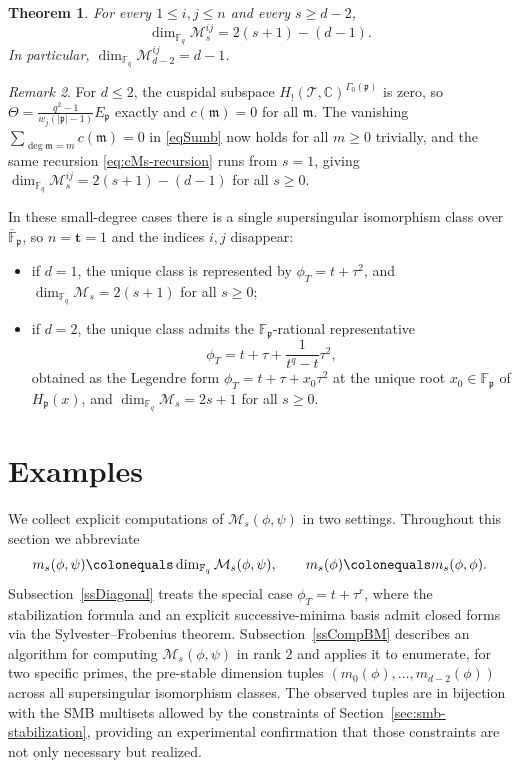\documentclass[12pt]{amsart}
\newtheorem{thm}{Theorem}[section]
\theoremstyle{definition}
\theoremstyle{remark}
\newtheorem{rem}[thm]{Remark}
\numberwithin{equation}{section}
\numberwithin{thm}{section}
\newcommand{\fm}{\mathfrak{m}}
\newcommand{\fp}{\mathfrak{p}}
\newcommand{\cM}{\mathcal{M}}
\newcommand{\cT}{\mathcal{T}}
\newcommand{\C}{\mathbb{C}}
\newcommand{\F}{\mathbb{F}}
\newcommand{\G}{\Gamma}
\newcommand{\oF}{\overline{\F}}
\newcommand{\abs}[1]{\left|#1\right|}
\begin{document}
	\begin{thm}\label{thmMain}
		For every $1\leq i, j\leq n$ and every $s\geq d-2$,
		\[
		\dim_{\F_q}\cM_s^{ij} = 2(s+1) - (d-1).
		\]
		In particular, $\dim_{\F_q}\cM_{d-2}^{ij} = d-1$.
	\end{thm}
	
	\begin{rem}\label{rmk:small-d}
		For $d\leq 2$, the cuspidal subspace $H_!(\cT,\C)^{\G_0(\fp)}$ is zero, so $\Theta = \frac{q^2-1}{w_j(\abs{\fp}-1)} E_\fp$ exactly and $c(\fm) = 0$ for all $\fm$. The vanishing $\sum_{\deg\fm = m} c(\fm) = 0$ in \eqref{eqSumb} now holds for all $m\geq 0$ trivially, and the same recursion \eqref{eq:cMs-recursion} runs from $s = 1$, giving $\dim_{\F_q}\cM_s^{ij} = 2(s+1) - (d-1)$ for all $s \geq 0$.
		
		In these small-degree cases there is a single supersingular isomorphism class over $\oF_\fp$, so $n = \mathbf{t} = 1$ and the indices $i,j$ disappear:
		\begin{itemize}
			\item if $d = 1$, the unique class is represented by $\phi_T = t + \tau^2$, and $\dim_{\F_q}\cM_s = 2(s+1)$ for all $s \geq 0$;
			\item if $d = 2$, the unique class admits the $\F_\fp$-rational representative
			\[
			\phi_T = t + \tau + \frac{1}{t^q - t}\tau^2,
			\]
			obtained as the Legendre form $\phi_T = t + \tau + x_0\tau^2$ at the unique root $x_0 \in \F_\fp$ of $H_\fp(x)$, and $\dim_{\F_q}\cM_s = 2s + 1$ for all $s \geq 0$.
		\end{itemize}
	\end{rem}
	

\section{Examples}\label{sExample}

We collect explicit computations of $\cM_s(\phi,\psi)$ in two settings. Throughout this section we abbreviate
\[
m_s(\phi,\psi) \colonequals \dim_{\F_q}\cM_s(\phi,\psi), \qquad m_s(\phi) \colonequals m_s(\phi,\phi).
\]
Subsection~\ref{ssDiagonal} treats the special case $\phi_T = t + \tau^r$, where the stabilization formula and an explicit successive-minima basis admit closed forms via the Sylvester--Frobenius theorem. Subsection~\ref{ssCompBM} describes an algorithm for computing $\cM_s(\phi,\psi)$ in rank $2$ and applies it to enumerate, for two specific primes, the pre-stable dimension tuples $(m_0(\phi),\ldots,m_{d-2}(\phi))$ across all supersingular isomorphism classes. The observed tuples are in bijection with the SMB multisets allowed by the constraints of Section~\ref{sec:smb-stabilization}, providing an experimental confirmation that those constraints are not only necessary but realized.
\end{document}
